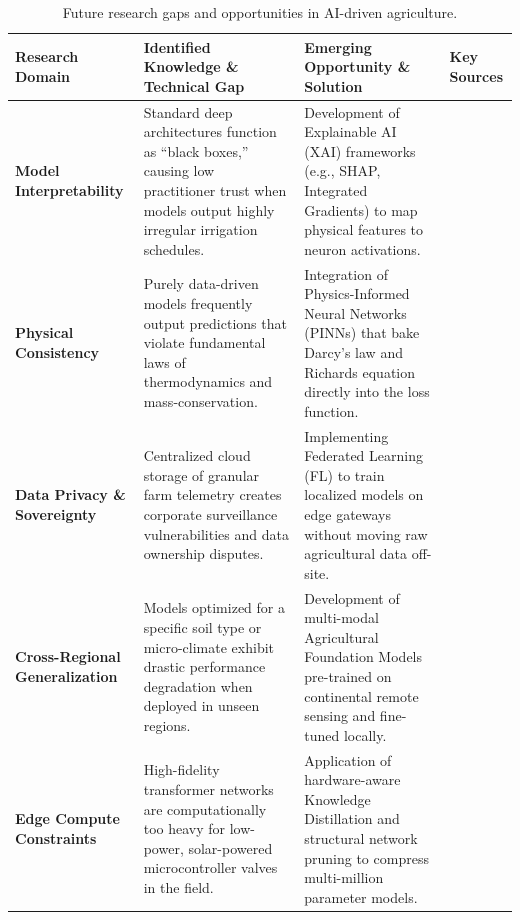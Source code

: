 \documentclass[land,article,submit,pdftex,moreauthors]{Definitions/mdpi}
\numberwithin{equation}{section}
\begin{document}
\begin{longtable}{@{\extracolsep{\fill}} p{} p{} p{} p{} @{}}
\caption{Future research gaps and opportunities in AI-driven agriculture. \label{tab:future_gaps}}\\
\toprule
\textbf{Research Domain} & \textbf{Identified Knowledge \& Technical Gap} & \textbf{Emerging Opportunity \& Solution} & \textbf{Key Sources} \\
\midrule
\endhead 

\bottomrule
\endfoot 

\textbf{Model Interpretability} & 
Standard deep architectures function as ``black boxes,'' causing low practitioner trust when models output highly irregular irrigation schedules. & 
Development of Explainable AI (XAI) frameworks (e.g., SHAP, Integrated Gradients) to map physical features to neuron activations. & 
\citep{Pai_2025} \\ \hline

\textbf{Physical Consistency} & 
Purely data-driven models frequently output predictions that violate fundamental laws of thermodynamics and mass-conservation. & 
Integration of Physics-Informed Neural Networks (PINNs) that bake Darcy's law and Richards equation directly into the loss function. & 
 \\ \hline

\textbf{Data Privacy \& Sovereignty} & 
Centralized cloud storage of granular farm telemetry creates corporate surveillance vulnerabilities and data ownership disputes. & 
Implementing Federated Learning (FL) to train localized models on edge gateways without moving raw agricultural data off-site. & 
\citep{electronics14132512} \\ \hline

\textbf{Cross-Regional Generalization} & 
Models optimized for a specific soil type or micro-climate exhibit drastic performance degradation when deployed in unseen regions. & 
Development of multi-modal Agricultural Foundation Models pre-trained on continental remote sensing and fine-tuned locally. & 
\\ \hline

\textbf{Edge Compute Constraints} & 
High-fidelity transformer networks are computationally too heavy for low-power, solar-powered microcontroller valves in the field. & 
Application of hardware-aware Knowledge Distillation and structural network pruning to compress multi-million parameter models. & 
\\

\end{longtable}
\normalsize
\end{document}
